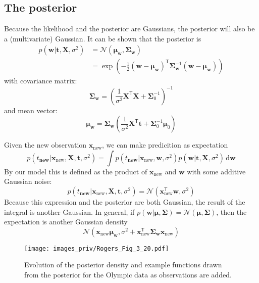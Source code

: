\subsection{The posterior}
Because the likelihood and the posterior are Gaussians, the posterior will also be
a (multivariate) Gaussian.
It can be shown that the posterior is
\begin{align}
p(\mathbf{w} | \mathbf{t}, \mathbf{X}, \sigma^2) & =
\mathcal{N}(\boldsymbol{\mu}_{\mathbf{w}},\boldsymbol{\Sigma}_{\mathbf{w}}) \\
& = \exp\left(
-\frac{1}{2}(\mathbf{w} - \boldsymbol{\mu}_{\mathbf{w}})^{\mathsf{T}}
\boldsymbol{\Sigma}^{-1}_{\mathbf{w}}
(\mathbf{w} - \boldsymbol{\mu}_{\mathbf{w}})
\right)
\end{align}
with covariance matrix:
\begin{equation}
\boldsymbol{\Sigma}_{\mathbf{w}} = \left(
\frac{1}{\sigma^2}\mathbf{X}^{\mathsf{T}}\mathbf{X} + \boldsymbol{\Sigma}^{-1}_{0}
\right)^{-1}
\end{equation}
and mean vector:
\begin{equation}
\boldsymbol{\mu}_{\mathbf{w}} = \boldsymbol{\Sigma}_{\mathbf{w}}
\left(
\frac{1}{\sigma^2}\mathbf{X}^{\mathsf{T}}\mathbf{t} +
\boldsymbol{\Sigma}_{0}^{-1}\boldsymbol{\mu}_{0}
\right)
\end{equation}

Given the new observation $\mathbf{x}_{\mathrm{new}}$, we can make
predicition as expectation
\begin{equation*}
p(t_{\mathbf{new}} | \mathbf{x}_{\mathrm{new}}, \mathbf{X}, \mathbf{t}, \sigma^2) =
\int p(t_{\mathbf{new}} | \mathbf{x}_{\mathrm{new}}, \mathbf{w}, \sigma^2)
p(\mathbf{w} | \mathbf{t}, \mathbf{X}, \sigma^2)\,\mathrm{d}\mathbf{w}
\end{equation*}
By our model this is defined as the product of $\mathbf{x}_{\mathrm{new}}$
and $\mathbf{w}$ with some additive Gaussian noise:
\begin{equation*}
p(t_{\mathbf{new}} | \mathbf{x}_{\mathrm{new}}, \mathbf{X}, \mathbf{t}, \sigma^2) =
\mathcal{N}(\mathbf{x}_{\mathrm{new}}^{\mathsf{T}}\mathbf{w}, \sigma^2)
\end{equation*}
Because this expression and the posterior are both Gaussian, the result of the
integral is another Gaussian. In general, if
$p(\mathbf{w}|\boldsymbol{\mu},\boldsymbol{\Sigma}) =
\mathcal{N}(\boldsymbol{\mu},\boldsymbol{\Sigma})$, then the expectation
is another Gaussian density
\begin{equation}
\mathcal{N}(\mathbf{x}_{\mathrm{new}}\boldsymbol{\mu}_{\mathbf{w}},
\sigma^2 +
\mathbf{x}_{\mathrm{new}}^{\mathsf{T}}\boldsymbol{\Sigma}_{\mathbf{w}}
\mathbf{x}_{\mathrm{new}})
\end{equation}

\begin{figure}[h]
{\centering
\texttt{[image: images\_priv/Rogers\_Fig\_3\_20.pdf]}
\par}
\caption{Evolution of the posterior density and example functions
drawn from the posterior for the Olympic data as observations are
added.}
\label{fig:Rogers_3_20}
\end{figure}






